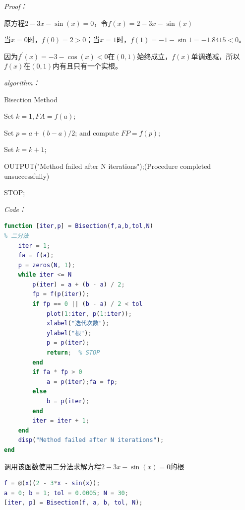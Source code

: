 \documentclass[12pt]{ctexart}
\begin{document}
	\textit{Proof：}
	
	原方程$2-3x-\sin(x)=0$，令$f(x)=2-3x-\sin(x)$
	
	当$x=0$时，$f(0)=2>0$；当$x=1$时，$f(1)=-1-\sin1=-1.8415<0$。
	
	因为$f^{'}(x)=-3-\cos(x)<0$在$(0,1)$始终成立，$f(x)$单调递减，所以$f(x)$在$(0,1)$内有且只有一个实根。
	
	\textit{algorithm：}
	
	\begin{algorithm}
		\caption{Bisection Method}
		Set $k=1,FA=f(a)$;
		
		{
			Set $p=a+(b-a)/2$; and compute $FP=f(p)$;
			
			
			Set $k=k+1$;
			
		}
		
		OUTPUT("Method failed after N iterations");(Procedure completed unsuccessfully)
		
		STOP;
	\end{algorithm}
	
	\textit{Code：}

\begin{lstlisting}[language = MATLAB]
function [iter,p] = Bisection(f,a,b,tol,N)
% 二分法
	iter = 1;
	fa = f(a);
	p = zeros(N, 1);
	while iter <= N
		p(iter) = a + (b - a) / 2;
		fp = f(p(iter));
		if fp == 0 || (b - a) / 2 < tol
			plot(1:iter, p(1:iter));
			xlabel("迭代次数");
			ylabel("根");
			p = p(iter);
			return;  % STOP
		end
		if fa * fp > 0
			a = p(iter);fa = fp;
		else
			b = p(iter);
		end
		iter = iter + 1;
	end
	disp("Method failed after N iterations");
end
\end{lstlisting}

	调用该函数使用二分法求解方程$2-3x-\sin(x)=0$的根
	
\begin{lstlisting}[language = MATLAB]
% 第2章第2题
f = @(x)(2 - 3*x - sin(x));
a = 0; b = 1; tol = 0.0005; N = 30;
[iter, p] = Bisection(f, a, b, tol, N);
\end{lstlisting}
	
\end{document}
